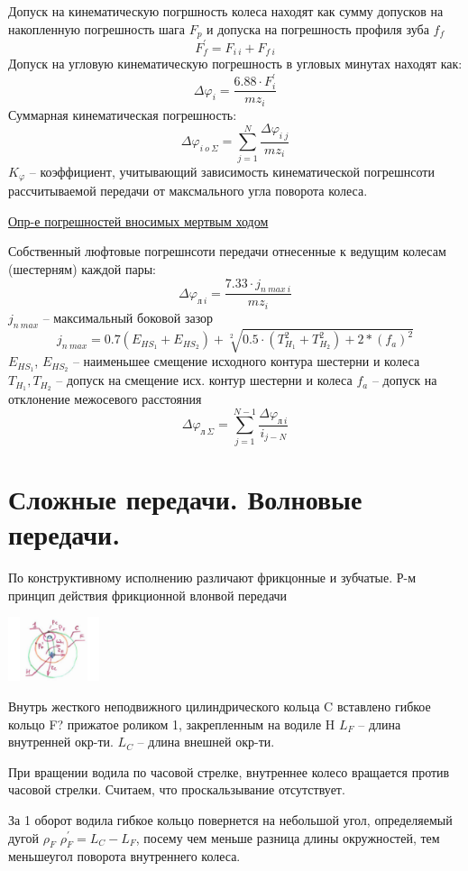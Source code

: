 \documentclass{article}
\begin{document}
\begin{multicols}{3}
Допуск на кинематическую погршность колеса находят как сумму допусков на накопленную погрешность шага $F_p$
и допуска на погрешность профиля зуба $f_f$
$$
F_{f}^{'} = F_{i\:i} + F_{f\:i}
$$
Допуск на угловую кинематическую погрешность в угловых минутах находят как:
$$
\Delta \varphi_i = \frac{6.88 \cdot F_i^{'}}{m z_i} 
$$
Суммарная кинематическая погрешность:
$$
\Delta \varphi_{i\:o\:\Sigma} = \sum\limits_{j = 1}^{N} \frac{ \Delta \varphi_{i\:j}}{m z_i}
$$
$K_\varphi$ -- коэффициент, учитывающий зависимость кинематической погрешнсоти рассчитываемой передачи от максмального 
угла поворота колеса.

\underline{Опр-е погрешностей вносимых мертвым ходом}

Собственный люфтовые погрешнсоти передачи отнесенные к ведущим колесам (шестерням) каждой пары:
$$
\Delta \varphi_{л \: i} = \frac{7.33 \cdot j_{n\:max\:i}}{m z_i} 
$$
$j_{n\:max}$ -- максимальный боковой зазор
$$
j_{n\:max} = 0.7 \left (E_{HS_1} + E_{HS_2}\right) + \sqrt[2]{0.5\cdot\left(T_{H_1}^2 + T_{H_2}^2\right) + 2 * \left(f_a\right)^2}
$$
$E_{HS_1}$, $E_{HS_2}$ -- наименьшее смещение исходного контура шестерни и колеса
$T_{H_1}, T_{H_2}$ -- допуск на смещение исх. контур шестерни и колеса
$f_a$ -- допуск на отклонение межосевого расстояния
$$
\Delta \varphi_{л\:\Sigma} = \sum\limits_{j=1}^{N-1} \frac{ \Delta \varphi_{л \: i}}{i_{j - N}} 
$$

\section {\tiny Сложные передачи. Волновые передачи.}

По конструктивному исполнению различают фрикцонные и зубчатые. Р-м принцип действия фрикционной влонвой передачи

\includegraphics[width = 0.2\textwidth]{15_1}

Внутрь жесткого неподвижного цилиндрического кольца C вставлено гибкое кольцо F? прижатое роликом 1, закрепленным на водиле H
$L_F$ -- длина внутренней окр-ти.
$L_C$ -- длина внешней окр-ти.

При вращении водила по часовой стрелке, внутреннее колесо вращается против часовой стрелки. Считаем, что проскальзывание отсутствует.

За 1 оборот водила гибкое кольцо повернется на небольшой угол, определяемый дугой $\rho_F$ $\rho_F^{'} = L_C - L_F$, посему чем меньше разница длины окружностей, тем меньшеугол поворота внутреннего колеса.


\end{multicols}
\end{document}
